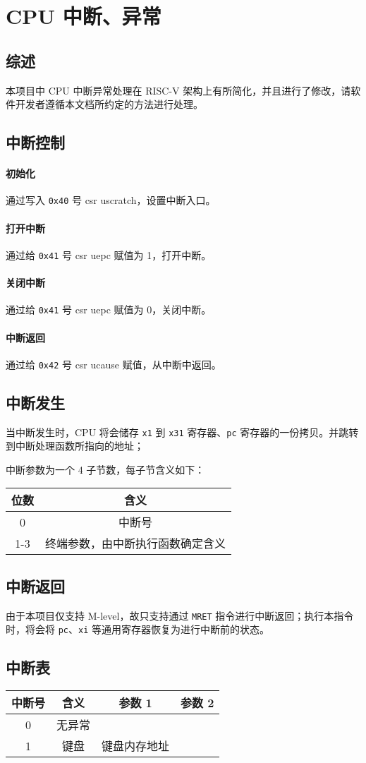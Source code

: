 
\chapter{CPU 中断、异常}

\section{综述}
本项目中 CPU 中断异常处理在 RISC-V 架构上有所简化，并且进行了修改，请软件开发者遵循本文档所约定的方法进行处理。

\section{中断控制}

\subsubsection{初始化}
通过写入 \texttt{0x40} 号 csr uscratch，设置中断入口。

\subsubsection{打开中断}
通过给 \texttt{0x41} 号 csr uepc 赋值为 1，打开中断。

\subsubsection{关闭中断}
通过给 \texttt{0x41} 号 csr uepc 赋值为 0，关闭中断。

\subsubsection{中断返回}
通过给 \texttt{0x42} 号 csr ucause 赋值，从中断中返回。

\section{中断发生}

当中断发生时，CPU 将会储存 \texttt{x1} 到 \texttt{x31} 寄存器、\texttt{pc} 寄存器的一份拷贝。并跳转到中断处理函数所指向的地址；

中断参数为一个 4 子节数，每子节含义如下：
\begin{tabular}{|c|c|}
    \hline
    位数 & 含义 \\\hline
    0     & 中断号 \\\hline
    1-3     & 终端参数，由中断执行函数确定含义 \\\hline
\end{tabular}

\section{中断返回}

由于本项目仅支持 M-level，故只支持通过 \texttt{MRET} 指令进行中断返回；执行本指令时，将会将 \texttt{pc}、\texttt{xi} 等通用寄存器恢复为进行中断前的状态。

\section{中断表}
\begin{tabular}{|c|c|c|c|}
    \hline
    中断号 & 含义 & 参数 1 & 参数 2\\\hline
    0     & 无异常 & &\\\hline
    1     & 键盘 & 键盘内存地址 &\\\hline
\end{tabular}